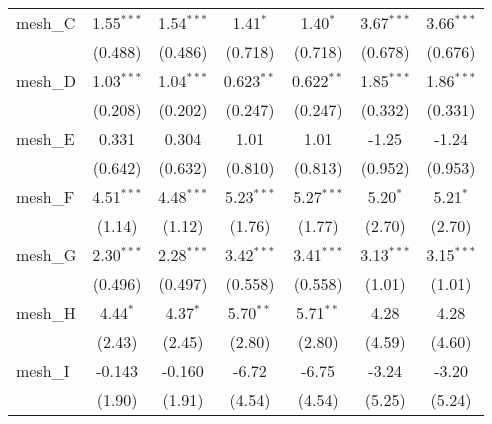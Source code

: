 \begin{tabular}{lcccccc}
   mesh\_C                                                     & 1.55$^{***}$  & 1.54$^{***}$  & 1.41$^{*}$    & 1.40$^{*}$    & 3.67$^{***}$  & 3.66$^{***}$\\   
                                                               & (0.488)       & (0.486)       & (0.718)       & (0.718)       & (0.678)       & (0.676)\\   
   mesh\_D                                                     & 1.03$^{***}$  & 1.04$^{***}$  & 0.623$^{**}$  & 0.622$^{**}$  & 1.85$^{***}$  & 1.86$^{***}$\\   
                                                               & (0.208)       & (0.202)       & (0.247)       & (0.247)       & (0.332)       & (0.331)\\   
   mesh\_E                                                     & 0.331         & 0.304         & 1.01          & 1.01          & -1.25         & -1.24\\   
                                                               & (0.642)       & (0.632)       & (0.810)       & (0.813)       & (0.952)       & (0.953)\\   
   mesh\_F                                                     & 4.51$^{***}$  & 4.48$^{***}$  & 5.23$^{***}$  & 5.27$^{***}$  & 5.20$^{*}$    & 5.21$^{*}$\\   
                                                               & (1.14)        & (1.12)        & (1.76)        & (1.77)        & (2.70)        & (2.70)\\   
   mesh\_G                                                     & 2.30$^{***}$  & 2.28$^{***}$  & 3.42$^{***}$  & 3.41$^{***}$  & 3.13$^{***}$  & 3.15$^{***}$\\   
                                                               & (0.496)       & (0.497)       & (0.558)       & (0.558)       & (1.01)        & (1.01)\\   
   mesh\_H                                                     & 4.44$^{*}$    & 4.37$^{*}$    & 5.70$^{**}$   & 5.71$^{**}$   & 4.28          & 4.28\\   
                                                               & (2.43)        & (2.45)        & (2.80)        & (2.80)        & (4.59)        & (4.60)\\   
   mesh\_I                                                     & -0.143        & -0.160        & -6.72         & -6.75         & -3.24         & -3.20\\   
                                                               & (1.90)        & (1.91)        & (4.54)        & (4.54)        & (5.25)        & (5.24)\\   

\end{tabular}
